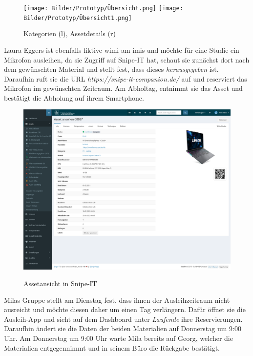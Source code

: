 \begin{figure}[h]
    \centering
    \texttt{[image: Bilder/Prototyp/Übersicht.png]}\hspace{2em}
    \texttt{[image: Bilder/Prototyp/Übersicht1.png]}
    \label{fig:p4}
    \caption[Mockup: Kategorien, Assets, Assetdetails]{Kategorien (l), Assetdetails (r)}
\end{figure}

Laura Eggers ist ebenfalls fiktive \ac{wimi} am \ac{imis} und möchte für eine Studie ein Mikrofon
ausleihen, da sie Zugriff auf Snipe-IT hat, schaut sie zunächst dort nach dem gewünschten Material
und stellt fest, dass dieses \textit{herausgegeben} ist. Daraufhin ruft sie die URL
\textit{https://snipe-it-companion.de/} auf und reserviert das Mikrofon im gewünschten Zeitraum. 
Am Abholtag, entnimmt sie das Asset und bestätigt die Abholung auf ihrem Smartphone.

\begin{figure}[h]
    \centering
    \includegraphics[scale=0.16]{Bilder/Screenshot 2022-10-14 at 11-26-25 Asset ansehen 00087 Ausleihmanagement.png}
    \label{fig:p4}
    \caption[Assetansicht in Snipe-IT]{Assetansicht in Snipe-IT}
\end{figure}

Milas Gruppe stellt am Dienstag fest, dass ihnen der Ausleihzeitraum nicht ausreicht und möchte
diesen daher um einen Tag verlängern. Dafür öffnet sie die Ausleih-App und sieht auf dem Dashboard
unter \textit{Laufende} ihre Reservierungen. Daraufhin ändert sie die Daten der beiden Materialien
auf Donnerstag um 9:00 Uhr. Am Donnerstag um 9:00 Uhr warte Mila bereits auf Georg, welcher die
Materialien entgegennimmt und in seinem Büro die Rückgabe bestätigt.

